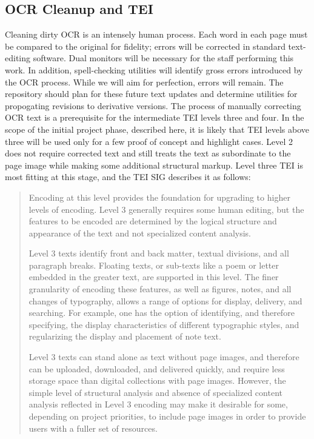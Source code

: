 \subsection{OCR Cleanup and TEI}
Cleaning dirty OCR is an intensely human process. Each word in each page must be compared to the original for fidelity; errors will be corrected in standard text-editing software. Dual monitors will be necessary for the staff performing this work. In addition, spell-checking utilities will identify gross errors introduced by the OCR process. While we will aim for perfection, errors will remain. The repository should plan for these future text updates and determine utilities for propogating revisions to derivative versions.
The process of manually correcting OCR text is a prerequisite for the intermediate TEI levels three and four. In the scope of the initial project phase, described here, it is likely that TEI levels above three will be used only for a few proof of concept and highlight cases. Level 2 does not require corrected text and still treats the text as subordinate to the page image while making some additional structural markup. Level three TEI is most fitting at this stage, and the TEI SIG describes it as follows:
\begin{quote}
Encoding at this level provides the foundation for upgrading to higher levels of encoding. Level 3 generally requires some human editing, but the features to be encoded are determined by the logical structure and appearance of the text and not specialized content analysis.

Level 3 texts identify front and back matter, textual divisions, and all paragraph breaks. Floating texts, or sub-texts like a poem or letter embedded in the greater text, are supported in this level. The finer granularity of encoding these features, as well as figures, notes, and all changes of typography, allows a range of options for display, delivery, and searching. For example, one has the option of identifying, and therefore specifying, the display characteristics of different typographic styles, and regularizing the display and placement of note text.

Level 3 texts can stand alone as text without page images, and therefore can be uploaded, downloaded, and delivered quickly, and require less storage space than digital collections with page images. However, the simple level of structural analysis and absence of specialized content analysis reflected in Level 3 encoding may make it desirable for some, depending on project priorities, to include page images in order to provide users with a fuller set of resources.
\cite{tei_sig_on_libraries_best_2011}
\end{quote}
